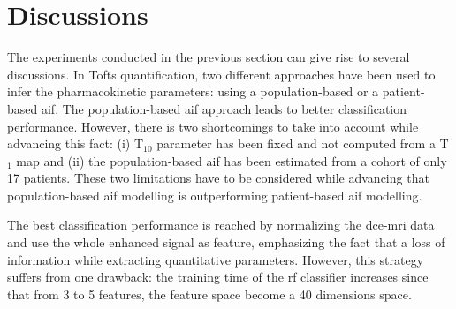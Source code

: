 \section{Discussions}\label{sec:discussions}

The experiments conducted in the previous section can give rise to several discussions.
In Tofts quantification, two different approaches have been used to infer the pharmacokinetic parameters: using a population-based or a patient-based \ac{aif}.
The population-based \ac{aif} approach leads to better classification performance.
However, there is two shortcomings to take into account while advancing this fact:
(i) T$_{10}$ parameter has been fixed and not computed from a T$_1$ map and
(ii) the population-based \ac{aif} has been estimated from a cohort of only 17 patients.
These two limitations have to be considered while advancing that population-based \ac{aif} modelling is outperforming patient-based \ac{aif} modelling.

The best classification performance is reached by normalizing the \ac{dce}-\ac{mri} data and use the whole enhanced signal as feature, emphasizing the fact that a loss of information while extracting quantitative parameters.
However, this strategy suffers from one drawback: the training time of the \ac{rf} classifier increases since that from 3 to 5 features, the feature space become a 40 dimensions space.

